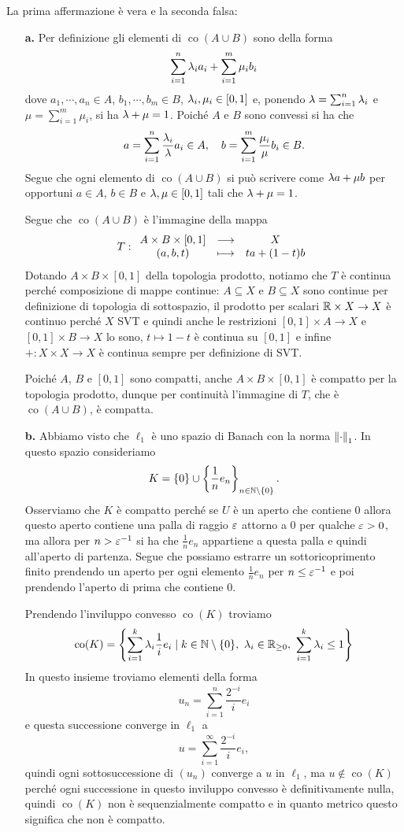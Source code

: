 \documentclass[a4paper]{article}
\newcommand{\normd}{{\norm{\cdot}}}
\DeclareMathOperator{\co}{co}
\begin{document}
\begin{solution}
La prima affermazione \`e vera e la seconda falsa:
\setlength{\leftmargini}{0cm}
\begin{enumerate}
\item [\textbf{a.}] Per definizione gli elementi di $\co(A\cup B)$ sono della forma
\[\sum_{i=1}^n\lambda_i a_i + \sum_{i=1}^m\mu_i b_i\]
dove $a_1,\cdots, a_n\in A$, $b_1,\cdots, b_m\in B$, $\lambda_i,\mu_i\in [0,1]$ e, ponendo $\lambda=\sum_{i=1}^n\lambda_i$ e $\mu=\sum_{i=1}^m\mu_i$, si ha $\lambda+\mu=1$. Poich\'e $A$ e $B$ sono convessi si ha che
\[a=\sum_{i=1}^n\frac{\lambda_i}{\lambda} a_i\in A,\quad b=\sum_{i=1}^m\frac{\mu_i}\mu b_i\in B.\]
Segue che ogni elemento di $\co(A\cup B)$ si pu\`o scrivere come $\lambda a+\mu b$ per opportuni $a\in A$, $b\in B$ e $\lambda,\mu\in [0,1]$ tali che $\lambda+\mu=1$.

Segue che $\co(A\cup B)$ \`e l'immagine della mappa
\[T:\begin{array}{ccc} {A\times B\times[0,1]} & \longrightarrow & {X}\\ {(a,b,t)} & \longmapsto & {ta+(1-t)b} \end{array}\]
Dotando $A\times B\times[0,1]$ della topologia prodotto, notiamo che $T$ \`e continua perch\'e composizione di mappe continue: $A\subseteq X$ e $B\subseteq X$ sono continue per definizione di topologia di sottospazio, il prodotto per scalari $\mathbb{R}\times X\to X$ \`e continuo perch\'e $X$ SVT e quindi anche le restrizioni $[0,1]\times A\to X$ e $[0,1]\times B\to X$ lo sono, $t\mapsto 1-t$ \`e continua su $[0,1]$ e infine $+:X\times X\to X$ \`e continua sempre per definizione di SVT.

Poich\'e $A$, $B$ e $[0,1]$ sono compatti, anche $A\times B\times [0,1]$ \`e compatto per la topologia prodotto, dunque per continuit\`a l'immagine di $T$, che \`e $\co(A\cup B)$, \`e compatta.
\item [\textbf{b.}] Abbiamo visto che $\ell_1$ \`e uno spazio di Banach con la norma $\normd_1$. In questo spazio consideriamo
\[K=\left\{{0}\right\}\cup \left\{{\frac1n e_n}\right\}_{n\in \mathbb{N}\setminus\{0\}}.\]
Osserviamo che $K$ \`e compatto perch\'e se $U$ \`e un aperto che contiene $0$ allora questo aperto contiene una palla di raggio $\varepsilon$ attorno a $0$ per qualche $\varepsilon>0$, ma allora per $n>\varepsilon^{-1}$ si ha che $\frac1n e_n$ appartiene a questa palla e quindi all'aperto di partenza. Segue che possiamo estrarre un sottoricoprimento finito prendendo un aperto per ogni elemento $\frac1n e_n$ per $n\leq \varepsilon^{-1}$ e poi prendendo l'aperto di prima che contiene $0$.

Prendendo l'inviluppo convesso $\co(K)$ troviamo
\[\co(K)=\cpa{\sum_{i=1}^k \la_i\frac1ie_i\mid k\in \N\nz,\ \la_i\in \R_{\geq 0},\ \sum_{i=1}^k\la_i\leq 1}\]
In questo insieme troviamo elementi della forma
\[u_n=\sum_{i=1}^n\frac{2^{-i}}ie_i\]
e questa successione converge in $\ell_1$ a 
\[u=\sum_{i=1}^\infty\frac{2^{-i}}ie_i,\]
quindi ogni sottosuccessione di $(u_n)$ converge a $u$ in $\ell_1$, ma $u\notin \co(K)$ perch\'e ogni successione in questo inviluppo convesso \`e definitivamente nulla, quindi $\co(K)$ non \`e sequenzialmente compatto e in quanto metrico questo significa che non \`e compatto.
\end{enumerate}
\setlength{\leftmargini}{0.5cm}
\end{solution}
\end{document}
